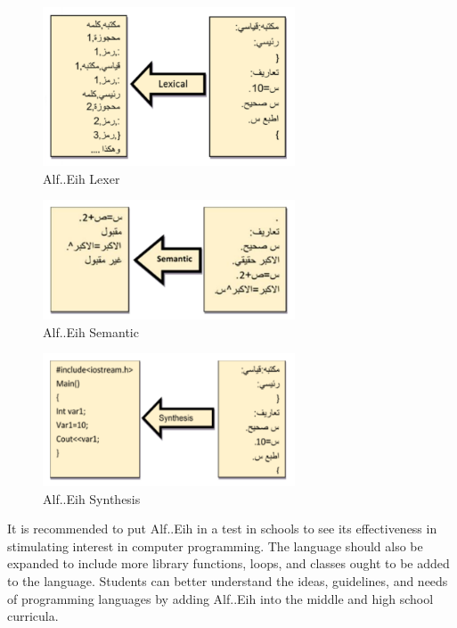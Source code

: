 \begin{figure}[H]
\centering
\includegraphics[width=7.5cm]{ch2-images/AlfEih4.png}
\caption{Alf..Eih Lexer \cite{razaq2019designing}}
\label{fig:Alf..Eih Lexer}
\end{figure}

\begin{figure}[H]
\centering
\includegraphics[width=7.5cm]{ch2-images/AlfEih5.png}
\caption{Alf..Eih Semantic \cite{razaq2019designing}}
\label{fig:Alf..Eih Semantic}
\end{figure}

\begin{figure}[H]
\centering
\includegraphics[width=7.5cm]{ch2-images/AlfEih6.png}
\caption{Alf..Eih Synthesis \cite{razaq2019designing}}
\label{fig:Alf..Eih Synthesis}
\end{figure}

It is recommended to put Alf..Eih in a test in schools to see its effectiveness in stimulating interest in computer programming. The language should also be expanded to include more library functions, loops, and classes ought to be added to the language. Students can better understand the ideas, guidelines, and needs of programming languages by adding Alf..Eih into the middle and high school curricula.
